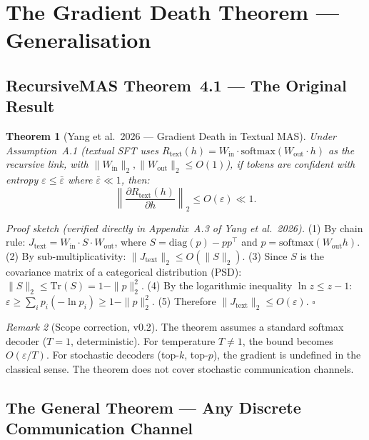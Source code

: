 \documentclass[11pt,a4paper]{article}
\theoremstyle{plain}
\newtheorem{theorem}{Theorem}[section]
\theoremstyle{definition}
\theoremstyle{remark}
\newtheorem{remark}[theorem]{Remark}
\begin{document}
\section{The Gradient Death Theorem --- Generalisation}

\subsection{RecursiveMAS Theorem~4.1 --- The Original Result}

\begin{keyresult}
\begin{theorem}[Yang et al.\ 2026 --- Gradient Death in Textual MAS]
Under Assumption~A.1 (textual SFT uses
$R_\text{text}(h) = W_\text{in} \cdot \text{softmax}(W_\text{out} \cdot h)$
as the recursive link, with
$\|W_\text{in}\|_2, \|W_\text{out}\|_2 \le O(1)$),
if tokens are confident with entropy $\varepsilon \le \bar\varepsilon$ where
$\bar\varepsilon \ll 1$, then:
\[
  \left\|\frac{\partial R_\text{text}(h)}{\partial h}\right\|_2 \le O(\varepsilon) \ll 1.
\]
\end{theorem}
\end{keyresult}

\textit{Proof sketch (verified directly in Appendix~A.3 of Yang et al.\ 2026).}
(1) By chain rule: $J_\text{text} = W_\text{in} \cdot S \cdot W_\text{out}$,
where $S = \text{diag}(p) - pp^\top$ and $p = \text{softmax}(W_\text{out} h)$.
(2) By sub-multiplicativity: $\|J_\text{text}\|_2 \le O(\|S\|_2)$.
(3) Since $S$ is the covariance matrix of a categorical distribution (PSD):
$\|S\|_2 \le \text{Tr}(S) = 1 - \|p\|_2^2$.
(4) By the logarithmic inequality $\ln z \le z - 1$:
$\varepsilon \ge \sum_i p_i(-\ln p_i) \ge 1 - \|p\|_2^2$.
(5) Therefore $\|J_\text{text}\|_2 \le O(\varepsilon)$. $\square$

\begin{remark}[Scope correction, v0.2]
The theorem assumes a standard softmax decoder ($T=1$, deterministic). For
temperature $T \ne 1$, the bound becomes $O(\varepsilon/T)$. For stochastic
decoders (top-$k$, top-$p$), the gradient is undefined in the classical sense.
The theorem does not cover stochastic communication channels.
\end{remark}

\subsection{The General Theorem --- Any Discrete Communication Channel}
\end{document}

